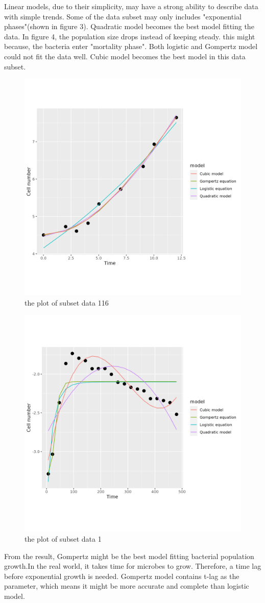 \documentclass[11pt]{article}
\begin{document}
Linear models, due to their simplicity, may have a strong ability to describe data with simple trends. Some of the data subset may only includes "exponential phases"(shown in figure 3). Quadratic model becomes the best model fitting the data. In figure 4, the population size drops instead of keeping steady. this might because, the bacteria enter "mortality phase". Both logistic and Gompertz model could not fit the data well. Cubic model becomes the best model in this data subset.
\begin{figure}
    \centering
    \includegraphics[width=0.5\linewidth]{../results/subset_ 116 _plot.png}
    \caption{the plot of subset data 116}
    \label{fig:subset1-plot116}
\end{figure}

\begin{figure}
  \centering
    \includegraphics[width=0.5\linewidth]{../results/subset_ 1 _plot.png}
    \caption{the plot of subset data 1 }
    \label{fig:subset1-plot1}
\end{figure}

From the result, Gompertz might be the best model fitting bacterial population growth.In the real world, it takes time for microbes to grow. Therefore, a time lag before exponential growth is needed. Gompertz model contains t-lag as the parameter, which means it might be more accurate and complete than logistic model. 
\end{document}
